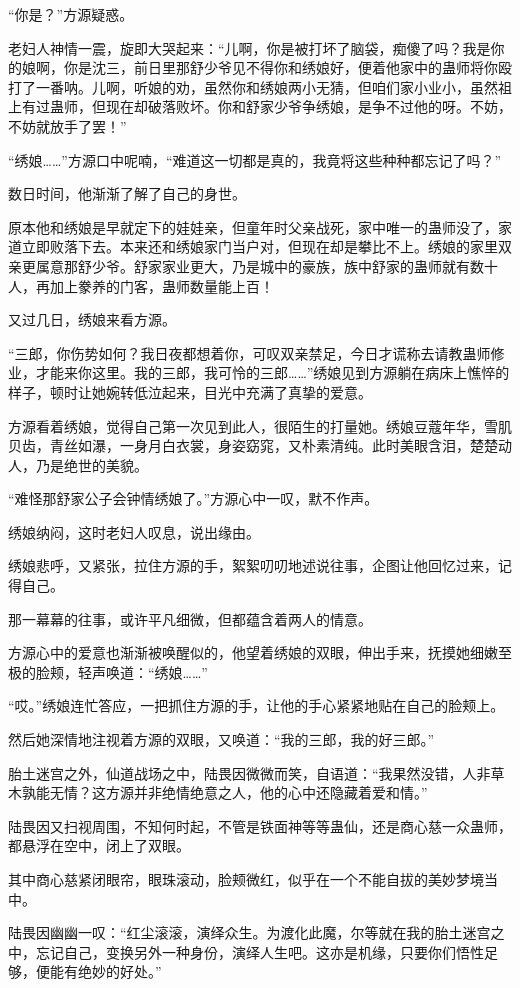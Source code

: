 \begin{this_body}
“你是？”方源疑惑。

老妇人神情一震，旋即大哭起来：“儿啊，你是被打坏了脑袋，痴傻了吗？我是你的娘啊，你是沈三，前日里那舒少爷见不得你和绣娘好，便着他家中的蛊师将你殴打了一番呐。儿啊，听娘的劝，虽然你和绣娘两小无猜，但咱们家小业小，虽然祖上有过蛊师，但现在却破落败坏。你和舒家少爷争绣娘，是争不过他的呀。不妨，不妨就放手了罢！”

“绣娘……”方源口中呢喃，“难道这一切都是真的，我竟将这些种种都忘记了吗？”

数日时间，他渐渐了解了自己的身世。

原本他和绣娘是早就定下的娃娃亲，但童年时父亲战死，家中唯一的蛊师没了，家道立即败落下去。本来还和绣娘家门当户对，但现在却是攀比不上。绣娘的家里双亲更属意那舒少爷。舒家家业更大，乃是城中的豪族，族中舒家的蛊师就有数十人，再加上豢养的门客，蛊师数量能上百！

又过几日，绣娘来看方源。

“三郎，你伤势如何？我日夜都想着你，可叹双亲禁足，今日才谎称去请教蛊师修业，才能来你这里。我的三郎，我可怜的三郎……”绣娘见到方源躺在病床上憔悴的样子，顿时让她婉转低泣起来，目光中充满了真挚的爱意。

方源看着绣娘，觉得自己第一次见到此人，很陌生的打量她。绣娘豆蔻年华，雪肌贝齿，青丝如瀑，一身月白衣裳，身姿窈窕，又朴素清纯。此时美眼含泪，楚楚动人，乃是绝世的美貌。

“难怪那舒家公子会钟情绣娘了。”方源心中一叹，默不作声。

绣娘纳闷，这时老妇人叹息，说出缘由。

绣娘悲呼，又紧张，拉住方源的手，絮絮叨叨地述说往事，企图让他回忆过来，记得自己。

那一幕幕的往事，或许平凡细微，但都蕴含着两人的情意。

方源心中的爱意也渐渐被唤醒似的，他望着绣娘的双眼，伸出手来，抚摸她细嫩至极的脸颊，轻声唤道：“绣娘……”

“哎。”绣娘连忙答应，一把抓住方源的手，让他的手心紧紧地贴在自己的脸颊上。

然后她深情地注视着方源的双眼，又唤道：“我的三郎，我的好三郎。”

胎土迷宫之外，仙道战场之中，陆畏因微微而笑，自语道：“我果然没错，人非草木孰能无情？这方源并非绝情绝意之人，他的心中还隐藏着爱和情。”

陆畏因又扫视周围，不知何时起，不管是铁面神等等蛊仙，还是商心慈一众蛊师，都悬浮在空中，闭上了双眼。

其中商心慈紧闭眼帘，眼珠滚动，脸颊微红，似乎在一个不能自拔的美妙梦境当中。

陆畏因幽幽一叹：“红尘滚滚，演绎众生。为渡化此魔，尔等就在我的胎土迷宫之中，忘记自己，变换另外一种身份，演绎人生吧。这亦是机缘，只要你们悟性足够，便能有绝妙的好处。”

\end{this_body}

